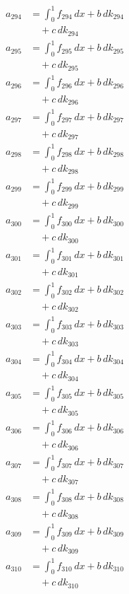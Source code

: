 \documentclass{article}
\begin{document}
\begin{align}
a_{294} &= \int_0^1 f_{294}\,dx + b\,dk_{294} \\
&\quad + c\,dk_{294} \\
a_{295} &= \int_0^1 f_{295}\,dx + b\,dk_{295} \\
&\quad + c\,dk_{295} \\
a_{296} &= \int_0^1 f_{296}\,dx + b\,dk_{296} \\
&\quad + c\,dk_{296} \\
a_{297} &= \int_0^1 f_{297}\,dx + b\,dk_{297} \\
&\quad + c\,dk_{297} \\
a_{298} &= \int_0^1 f_{298}\,dx + b\,dk_{298} \\
&\quad + c\,dk_{298} \\
a_{299} &= \int_0^1 f_{299}\,dx + b\,dk_{299} \\
&\quad + c\,dk_{299} \\
a_{300} &= \int_0^1 f_{300}\,dx + b\,dk_{300} \\
&\quad + c\,dk_{300} \\
a_{301} &= \int_0^1 f_{301}\,dx + b\,dk_{301} \\
&\quad + c\,dk_{301} \\
a_{302} &= \int_0^1 f_{302}\,dx + b\,dk_{302} \\
&\quad + c\,dk_{302} \\
a_{303} &= \int_0^1 f_{303}\,dx + b\,dk_{303} \\
&\quad + c\,dk_{303} \\
a_{304} &= \int_0^1 f_{304}\,dx + b\,dk_{304} \\
&\quad + c\,dk_{304} \\
a_{305} &= \int_0^1 f_{305}\,dx + b\,dk_{305} \\
&\quad + c\,dk_{305} \\
a_{306} &= \int_0^1 f_{306}\,dx + b\,dk_{306} \\
&\quad + c\,dk_{306} \\
a_{307} &= \int_0^1 f_{307}\,dx + b\,dk_{307} \\
&\quad + c\,dk_{307} \\
a_{308} &= \int_0^1 f_{308}\,dx + b\,dk_{308} \\
&\quad + c\,dk_{308} \\
a_{309} &= \int_0^1 f_{309}\,dx + b\,dk_{309} \\
&\quad + c\,dk_{309} \\
a_{310} &= \int_0^1 f_{310}\,dx + b\,dk_{310} \\
&\quad + c\,dk_{310} \\

\end{align}
\end{document}
